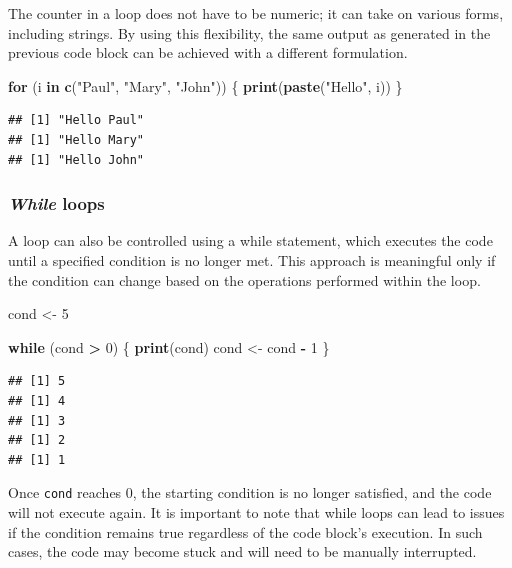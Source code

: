 \documentclass[
]{article}
\newenvironment{Shaded}{\begin{snugshade}}{\end{snugshade}}
\newcommand{\ControlFlowTok}[1]{\textcolor[rgb]{0.13,0.29,0.53}{\textbf{#1}}}
\newcommand{\DecValTok}[1]{\textcolor[rgb]{0.00,0.00,0.81}{#1}}
\newcommand{\FunctionTok}[1]{\textcolor[rgb]{0.13,0.29,0.53}{\textbf{#1}}}
\newcommand{\NormalTok}[1]{#1}
\newcommand{\OtherTok}[1]{\textcolor[rgb]{0.56,0.35,0.01}{#1}}
\newcommand{\SpecialCharTok}[1]{\textcolor[rgb]{0.81,0.36,0.00}{\textbf{#1}}}
\newcommand{\StringTok}[1]{\textcolor[rgb]{0.31,0.60,0.02}{#1}}
\begin{document}
The counter in a loop does not have to be numeric; it can take on various forms, including strings. By using this flexibility, the same output as generated in the previous code block can be achieved with a different formulation.

\begin{Shaded}
\begin{Highlighting}[]
\ControlFlowTok{for}\NormalTok{ (i }\ControlFlowTok{in} \FunctionTok{c}\NormalTok{(}\StringTok{"Paul"}\NormalTok{, }\StringTok{"Mary"}\NormalTok{, }\StringTok{"John"}\NormalTok{))}
\NormalTok{\{}
  \FunctionTok{print}\NormalTok{(}\FunctionTok{paste}\NormalTok{(}\StringTok{"Hello"}\NormalTok{, i))}
\NormalTok{\}}
\end{Highlighting}
\end{Shaded}

\begin{verbatim}
## [1] "Hello Paul"
## [1] "Hello Mary"
## [1] "Hello John"
\end{verbatim}

\subsubsection{\texorpdfstring{\emph{While} loops}{While loops}}\label{while-loops}

A loop can also be controlled using a while statement, which executes the code until a specified condition is no longer met. This approach is meaningful only if the condition can change based on the operations performed within the loop.

\begin{Shaded}
\begin{Highlighting}[]
\NormalTok{cond }\OtherTok{\textless{}{-}} \DecValTok{5}

\ControlFlowTok{while}\NormalTok{ (cond }\SpecialCharTok{\textgreater{}} \DecValTok{0}\NormalTok{)}
\NormalTok{\{}
  \FunctionTok{print}\NormalTok{(cond)}
\NormalTok{  cond }\OtherTok{\textless{}{-}}\NormalTok{ cond }\SpecialCharTok{{-}} \DecValTok{1}
\NormalTok{\}}
\end{Highlighting}
\end{Shaded}

\begin{verbatim}
## [1] 5
## [1] 4
## [1] 3
## [1] 2
## [1] 1
\end{verbatim}

Once \texttt{cond} reaches 0, the starting condition is no longer satisfied, and the code will not execute again. It is important to note that while loops can lead to issues if the condition remains true regardless of the code block's execution. In such cases, the code may become stuck and will need to be manually interrupted.
\end{document}

